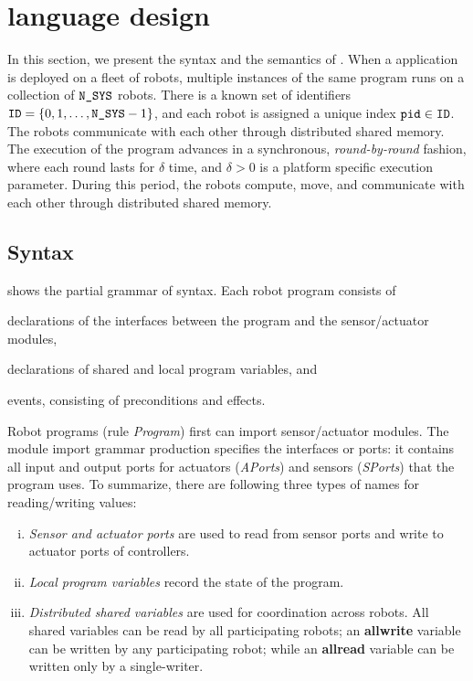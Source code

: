 \section{\lgname language design}
\label{sec:language}

In this section, we present the syntax and the semantics of \lgname.
%
%
When a \lgname application is deployed on a fleet of robots, multiple instances of the same program runs on a collection of $\texttt{N\_SYS}$ robots.
There is a known set of identifiers $\texttt{ID}=\{0,1,\dots,\texttt{N\_SYS}-1\}$, and each robot is assigned  a unique index $\texttt{pid} \in \texttt{ID}$.
%
The robots communicate with each other through distributed shared memory.
The execution of the \lgname program advances in a synchronous, \emph{round-by-round} fashion, where each round lasts for $\delta$ time,
and $\delta >0$ is a platform specific execution parameter.
During this period, the robots compute, move, and
communicate with each other through distributed shared memory.



\subsection{Syntax}\label{sec:syntax}

 shows the partial grammar of \lgname syntax.
Each robot program consists of
\begin{inparaenum}[(a)]
\item declarations of the interfaces between the program and the sensor/actuator modules,
\item declarations of shared and local program variables, and
\item events, consisting of preconditions and effects.
\end{inparaenum}
Robot programs (rule \emph{Program}) first can import sensor/actuator modules.
The module import grammar production specifies the interfaces or ports:
it contains all input and output ports for actuators (\emph{APorts}) and sensors (\emph{SPorts}) that the program uses.
To summarize, there are following three types of names for reading/writing values:
\begin{enumerate}[(i)]
\item \emph{Sensor and actuator ports} are used to read from sensor ports and write to actuator ports of controllers.
\item \emph{Local program variables} record the state of the program.
\item \emph{Distributed shared variables} are used for coordination across robots. All shared variables can be read by all participating robots; an
      \textbf{allwrite} variable can be written by any participating robot; while an
      \textbf{allread} variable can be written only by a single-writer.
\end{enumerate}

